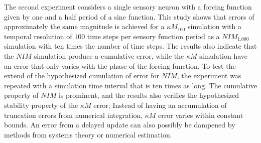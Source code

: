 The second experiment considers a single sensory neuron with a forcing function given by one and a half period of a sine function. %
This study shows that errors of approximately the same magnitude is achieved for a $\kappa M_{100}$ simulation with a temporal resolution 
	of $100$ time steps per sensory function period as a $NIM_{1.000}$ simulation with ten times the number of time steps.
The results also indicate that the $NIM$ simulation produce a cumulative error, while the $\kappa M$ simulation have 
	an error that only varies with the phase of the forcing function.
To test the extend of the hypothesized cumulation of error for $NIM$, %
	the experiment was repeated with a simulation time interval that is ten times as long.
The cumulative property of $NIM$ is prominent, and the results also verifies the hypothesized stability property of the $\kappa M$ error;
	Instead of having an accumulation of truncation errors from numerical integration, $\kappa M$ error varies within constant bounds. %
An error from a delayed update can also possibly be dampened by methods from systems theory or numerical estimation.
 	

